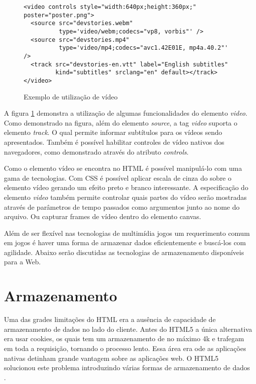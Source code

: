 \begin{figure}[H]
\centering
\begin{verbatim}
<video controls style="width:640px;height:360px;" poster="poster.png">
  <source src="devstories.webm" 
          type='video/webm;codecs="vp8, vorbis"' />
  <source src="devstories.mp4" 
          type='video/mp4;codecs="avc1.42E01E, mp4a.40.2"' />
  <track src="devstories-en.vtt" label="English subtitles" 
         kind="subtitles" srclang="en" default></track>
</video>
\end{verbatim}
\caption{Exemplo de utilização de vídeo}
\label{fig:video}
\end{figure}

A figura \ref{fig:video} demonstra a utilização de algumas
funcionalidades do elemento \textit{video}. Como demonstrado na figura,
além do elemento \textit{source}, a tag \textit{video} suporta o
elemento \textit{track}. O qual permite informar subtítulos para os
vídeos sendo apresentados. Também é possível habilitar controles de
vídeo nativos dos navegadores, como demonstrado através do atributo
\textit{controls}.

Como o elemento vídeo se encontra no HTML é possível manipulá-lo com
uma gama de tecnologias. Com CSS é possível aplicar escala de cinza do
sobre o elemento vídeo gerando um efeito preto e branco interessante.
A especificação do elemento \textit{video} também permite controlar
quais partes do vídeo serão mostradas através de parâmetros de tempo
passados como argumentos junto ao nome do arquivo. Ou capturar 
frames de vídeo dentro do elemento canvas.

Além de ser flexível nas tecnologias de multimídia jogos um
requerimento comum em jogos é haver uma forma de armazenar dados
eficientemente e buscá-los com agilidade. Abaixo serão discutidas as
tecnologias de armazenamento disponíveis para a Web.
\section{Armazenamento}
Uma das grades limitações do HTML era a ausência de capacidade de
armazenamento de dados no lado do cliente. Antes do HTML5 a única
alternativa era usar cookies, os quais tem um armazenamento de no
máximo 4k e trafegam em toda a requisição, tornando o processo lento.
Essa área era ode as aplicações nativas detinham grande vantagem
sobre as aplicações web. O HTML5 solucionou este problema introduzindo
várias formas de armazenamento de dados \autocite{html5Tradeoffs}.

